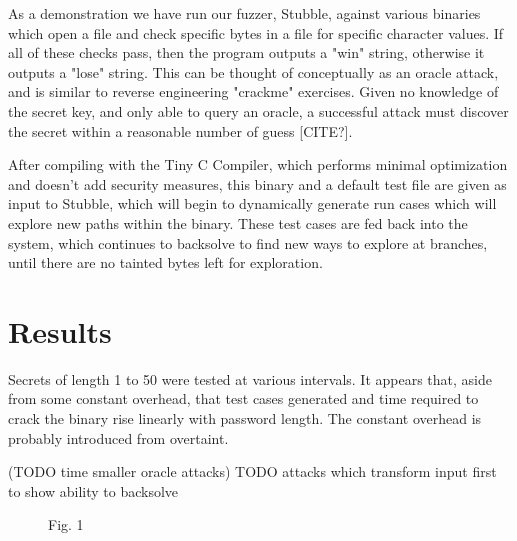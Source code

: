 \documentclass[11pt,expanded,copyright]{fsuthesis}
\begin{document}
As a demonstration we have run our fuzzer, Stubble, against various binaries which open a file and check specific bytes in a file for specific character values. If all of these checks pass, then the program outputs a "win" string, otherwise it outputs a "lose" string. This can be thought of conceptually as an oracle attack, and is similar to reverse engineering "crackme" exercises. Given no knowledge of the secret key, and only able to query an oracle, a successful attack must discover the secret within a reasonable number of guess [CITE?].

After compiling with the Tiny C Compiler, which performs minimal optimization and doesn't add security measures, this binary and a default test file are given as input to Stubble, which will begin to dynamically generate run cases which will explore new paths within the binary. These test cases are fed back into the system, which continues to backsolve to find new ways to explore at branches, until there are no tainted bytes left for exploration.


	
\section{Results}

Secrets of length 1 to 50 were tested at various intervals. It appears that, aside from some constant overhead, that test cases generated and time required to crack the binary  rise linearly with password length. The constant overhead is probably introduced from overtaint.


(TODO time smaller oracle attacks)
TODO attacks which transform input first to show ability to backsolve

\begin{figure}
\caption{Fig. 1}

\end{figure}
\end{document}
